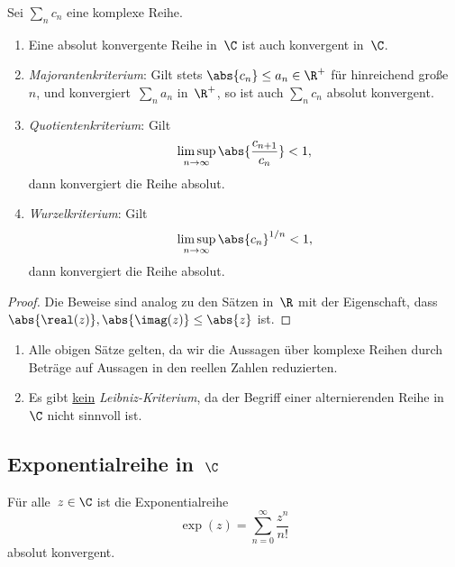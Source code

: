\documentclass[a4paper]{article}
\begin{document}
\begin{proposition}
    Sei $\sum_n c_n$ eine komplexe Reihe.
    \begin{enumerate}
        \item Eine absolut konvergente Reihe in~$\C$ ist auch konvergent in~$\C$.
        \item \emph{Majorantenkriterium}: Gilt stets $\abs{c_n} \leq a_n \in \R^+$ für hinreichend große~$n$, und konvergiert~$\sum_n a_n$ in~$\R^+$, so ist auch $\sum_n c_n$ absolut konvergent.
        \item \emph{Quotientenkriterium}: Gilt
              \begin{equation*}
                  \limsup_{n\to\infty} \abs{\frac{c_{n+1}}{c_n}} < 1,
              \end{equation*}
              dann konvergiert die Reihe absolut.
        \item \emph{Wurzelkriterium}: Gilt
              \begin{equation*}
                  \limsup_{n\to\infty} \abs{c_n}^{1/n} < 1,
              \end{equation*}
              dann konvergiert die Reihe absolut.
    \end{enumerate}
\end{proposition}

\begin{proof}
    Die Beweise sind analog zu den Sätzen in~$\R$ mit der Eigenschaft, dass $\abs{\real(z)}, \abs{\imag(z)} \leq \abs{z}$ ist.
\end{proof}

\begin{remark}\leavevmode
    \begin{enumerate}
        \item Alle obigen Sätze gelten, da wir die Aussagen über komplexe Reihen durch Beträge auf Aussagen in den reellen Zahlen reduzierten.
        \item Es gibt \underline{kein} \emph{Leibniz-Kriterium}, da der Begriff einer alternierenden Reihe in~$\C$ nicht sinnvoll ist.
    \end{enumerate}
\end{remark}

\subsection{Exponentialreihe in~\texorpdfstring{$\C$}{C}}

\begin{theorem}
    Für alle~$z \in \C$ ist die Exponentialreihe
    \begin{equation*}
        \exp(z) = \sum_{n=0}^\infty \frac{z^n}{n!}
    \end{equation*}
    absolut konvergent.
\end{theorem}
\end{document}
